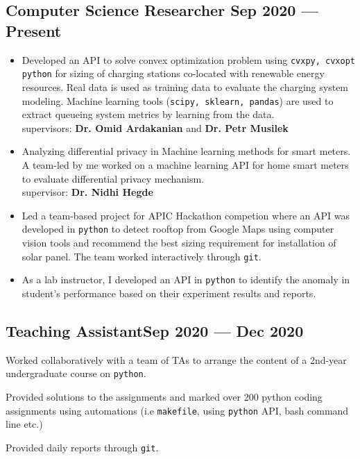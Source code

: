 \documentclass[letter,10pt]{article}
\begin{document}
\subsection{{Computer Science Researcher \hfill Sep 2020 --- Present}}
\begin{itemize}
\item Developed an API to solve convex optimization problem using \texttt{cvxpy, cvxopt python} for sizing of charging stations co-located with renewable energy resources. Real data is used as training data to evaluate the charging system modeling. Machine learning tools (\texttt{scipy, sklearn, pandas}) are used to extract queueing system metrics by learning from  the data.\\
supervisors: \textbf{Dr. Omid Ardakanian} and \textbf{Dr. Petr Musilek}
\item Analyzing differential privacy in Machine learning methods for smart meters. A team-led by me worked on a machine learning API for home smart meters to evaluate differential privacy mechanism.\\
supervisor: \textbf{Dr. Nidhi Hegde}

\item Led a team-based project for APIC Hackathon competion where an API was developed in \texttt{python} to detect rooftop from Google Maps using computer vision tools and recommend the best sizing requirement for installation of solar panel. The team worked interactively through \texttt{git}.

\item As a lab instructor, I developed an API in \texttt{python} to identify the anomaly in student's performance based on their experiment results and reports. 
\end{itemize}

\subsection{{Teaching Assistant\hfill Sep 2020 --- Dec 2020}}
\begin{zitemize}
	\item Worked collaboratively with a team of TAs to arrange the content of a 2nd-year undergraduate course on \texttt{python}.
	\item Provided solutions to the assignments and marked over 200 python coding assignments using automations (i.e \texttt{makefile}, using \texttt{python} API, bash command line etc.)
	\item Provided daily reports through \texttt{git}.
\end{zitemize}
\end{document}
